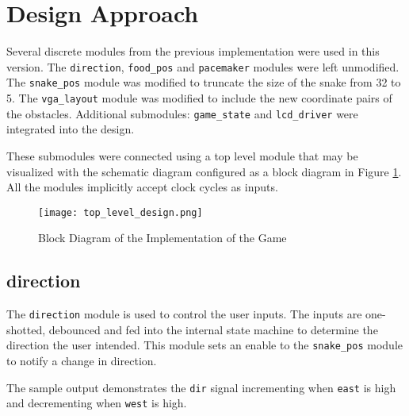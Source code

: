 \documentclass[paper=usletter, fontsize=12pt]{article}
\begin{document}
    \section{Design Approach} Several discrete modules from the previous
    implementation were used in this version. The \texttt{direction},
    \texttt{food\_pos} and \texttt{pacemaker} modules were left unmodified. The
    \texttt{snake\_pos} module was modified to truncate the size of the snake
    from 32 to 5. The \texttt{vga\_layout} module was modified to include the
    new coordinate pairs of the obstacles. Additional submodules:
    \texttt{game\_state} and \texttt{lcd\_driver} were integrated into the
    design.
 
    These submodules were connected using a top level module that may be
    visualized with the schematic diagram configured as a block diagram in
    Figure \ref{fig:schematic}. All the modules implicitly accept clock cycles
    as inputs.

    \begin{figure}[ht]
        \begin{center}
            \texttt{[image: top\_level\_design.png]}
            \caption{Block Diagram of the Implementation of the Game}
            \label{fig:schematic}
        \end{center}
    \end{figure}
    \newpage

        \subsection{direction} The \texttt{direction} module is used to control
        the user inputs. The inputs are one-shotted, debounced and fed into the
        internal state machine to determine the direction the user intended.
        This module sets an enable to the \texttt{snake\_pos} module to notify
        a change in direction.


        The sample output demonstrates the \texttt{dir} signal incrementing
        when \texttt{east} is high and decrementing when \texttt{west} is high.
\end{document}

